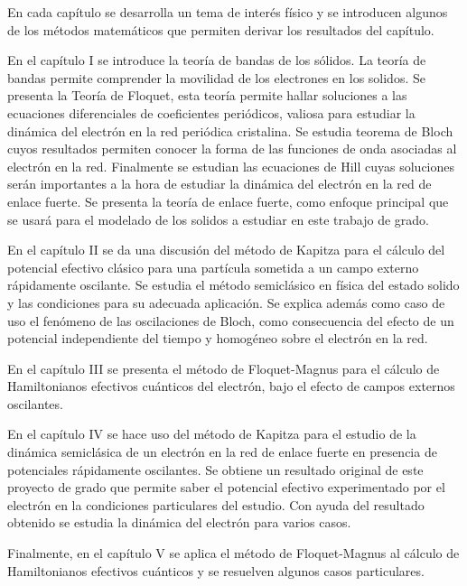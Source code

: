 En cada capítulo se desarrolla un tema de interés físico y se introducen algunos de los métodos matemáticos que permiten derivar los resultados del capítulo.

En el capítulo I se introduce la teoría de bandas de los sólidos. La teoría de bandas permite comprender la movilidad de los electrones en los solidos. Se presenta la Teoría de Floquet, esta teoría permite hallar soluciones a las ecuaciones diferenciales de coeficientes periódicos, valiosa para estudiar la dinámica del electrón en la red periódica cristalina. Se estudia teorema de Bloch cuyos resultados permiten conocer la forma de las funciones de onda asociadas al electrón en la red. Finalmente se estudian las ecuaciones de Hill cuyas soluciones serán importantes a la hora de estudiar la dinámica del electrón en la red de enlace fuerte. Se presenta la teoría de enlace fuerte, como enfoque principal que se usará para el modelado de los solidos a estudiar en este trabajo de grado. 

En el capítulo II se da una discusión del método de Kapitza para el cálculo del potencial efectivo clásico para una partícula sometida a un campo externo rápidamente oscilante. Se estudia el método semiclásico en física del estado solido y las condiciones para su adecuada aplicación. Se explica además como caso de uso el fenómeno de las oscilaciones de Bloch, como consecuencia del efecto de un potencial independiente del tiempo y homogéneo sobre el electrón en la red.

En el capítulo III se presenta el método de Floquet-Magnus para el cálculo de Hamiltonianos efectivos cuánticos del electrón, bajo el efecto de campos externos oscilantes.

En el capítulo IV se hace uso del método de Kapitza para el estudio de la dinámica semiclásica de un electrón en la red de enlace fuerte en presencia de potenciales rápidamente oscilantes. Se obtiene un resultado original de este proyecto de grado que permite saber el potencial efectivo experimentado por el electrón en la condiciones particulares del estudio. Con ayuda del resultado obtenido se estudia la dinámica del electrón para varios casos.

Finalmente, en el capítulo V se aplica el método de Floquet-Magnus al cálculo de Hamiltonianos efectivos cuánticos y se resuelven algunos casos particulares.  

